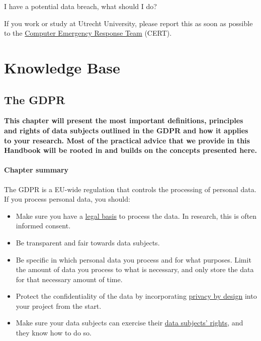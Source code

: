 \documentclass[
]{book}
\providecommand{\tightlist}{%
  \setlength{\itemsep}{0pt}\setlength{\parskip}{0pt}}
\begin{document}
I have a potential data breach, what should I do?

If you work or study at Utrecht University, please report this as soon as possible to the \href{https://intranet.uu.nl/en/security/information-security-computer-misuse-or-report-incident-cert}{Computer Emergency Response Team} (CERT).

\hypertarget{part-knowledge-base}{%
\part*{Knowledge Base}\label{part-knowledge-base}}

\hypertarget{gdpr}{%
\chapter*{The GDPR}\label{gdpr}}

\textbf{This chapter will present the most important definitions, principles and rights
of data subjects outlined in the GDPR and how it applies to your research. Most
of the practical advice that we provide in this Handbook will be rooted in and
builds on the concepts presented here.}

\hypertarget{chapter-summary}{%
\subsection{Chapter summary}\label{chapter-summary}}

The GDPR is a EU-wide regulation that controls the processing of personal data.
If you process personal data, you should:

\begin{itemize}
\tightlist
\item
  Make sure you have a \protect\hyperlink{legal-basis}{legal basis} to process the
  data. In research, this is often informed consent.
\item
  Be transparent and fair towards data subjects.
\item
  Be specific in which personal data you process and for what purposes. Limit
  the amount of data you process to what is necessary, and only store the data
  for that necessary amount of time.
\item
  Protect the confidentiality of the data by incorporating
  \protect\hyperlink{privacy-by-design}{privacy by design} into your project from the start.
\item
  Make sure your data subjects can exercise their
  \protect\hyperlink{data-subject-rights}{data subjects' rights}, and they know how to do so.
\end{itemize}
\end{document}
